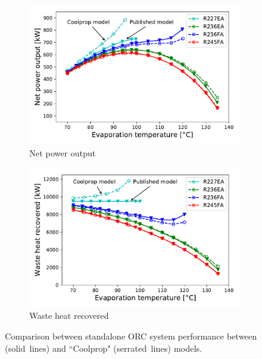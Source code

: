 \documentclass[a4paper,12pt]{article}
\begin{document}
\begin{figure}[H]
    \begin{subfigure}[l]{1\textwidth}
      \centering
      \includegraphics[scale = 0.65]{Images/ORC_PNET_SA.pdf}
      \caption{Net power output}\label{fig:ORC_PNET_SA}
    \end{subfigure}
    \begin{subfigure}[l]{1\textwidth}
      \centering
      \includegraphics[scale = 0.69]{Images/ORC_WH_REC_SA.pdf}
      \caption{Waste heat recovered}
      \label{fig:ORC_WH_REC_SA}
     \end{subfigure}
    \label{fig:ORC_SA}
    \caption{Comparison between standalone ORC system performance between \cite{YU2018330} (solid~lines) and ``Coolprop" (serrated~lines) models.}
\end{figure}
\end{document}

